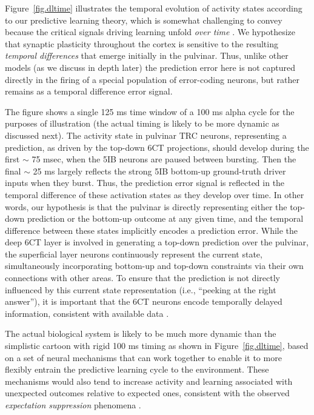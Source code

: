 \documentclass[11pt,twoside]{article}
\newif\myifpdf
\begin{document}
Figure~\ref{fig.dltime} illustrates the temporal evolution of activity states according to our predictive learning theory, which is somewhat challenging to convey because the critical signals driving learning unfold \emph{over time} \citep{KachergisWyatteOReillyEtAl14,OReillyWyatteRohrlich14,OReillyWyatteRohrlich17}.  We hypothesize that synaptic plasticity throughout the cortex is sensitive to the resulting \emph{temporal differences} that emerge initially in the pulvinar.  Thus, unlike other models (as we discuss in depth later) the prediction error here is not captured directly in the firing of a special population of error-coding neurons, but rather remains as a temporal difference error signal.

The figure shows a single 125 ms time window of a 100 ms alpha cycle for the purposes of illustration (the actual timing is likely to be more dynamic as discussed next).  The activity state in pulvinar TRC neurons, representing a prediction, as driven by the top-down 6CT projections, should develop during the first $\sim$ 75 msec, when the 5IB neurons are paused between bursting.  Then the final $\sim$ 25 ms largely reflects the strong 5IB bottom-up ground-truth driver inputs when they burst.  Thus, the prediction error signal is reflected in the temporal difference of these activation states as they develop over time.  In other words, our hypothesis is that the pulvinar is directly representing either the top-down prediction or the bottom-up outcome at any given time, and the temporal difference between these states implicitly encodes a prediction error.  While the deep 6CT layer is involved in generating a top-down prediction over the pulvinar, the superficial layer neurons continuously represent the current state, simultaneously incorporating bottom-up and top-down constraints via their own connections with other areas.  To ensure that the prediction is not directly influenced by this current state representation (i.e., ``peeking at the right answer''), it is important that the 6CT neurons encode temporally delayed information, consistent with available data \citep{HarrisShepherd15,SakataHarris09,Thomson10}.

The actual biological system is likely to be much more dynamic than the simplistic cartoon with rigid 100 ms timing as shown in Figure~\ref{fig.dltime}, based on a set of neural mechanisms that can work together to enable it to more flexibly entrain the predictive learning cycle to the environment.  These mechanisms would also tend to increase activity and learning associated with unexpected outcomes relative to expected ones, consistent with the observed \emph{expectation suppression} phenomena \citep{SummerfieldTrittschuhMontiEtAl08,TodorovicEdeMarisEtAl11,MeyerOlson11,BastosUsreyAdamsEtAl12}.
\end{document}
